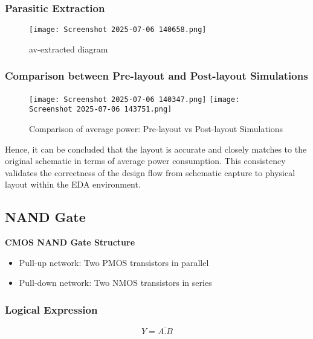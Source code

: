 \documentclass[12pt]{article}
\begin{document}
    \subsubsection{Parasitic Extraction}
        \begin{figure}[H]
            \centering
            \texttt{[image: Screenshot 2025-07-06 140658.png]}
            \caption{av-extracted diagram}
            \label{fig:enter-label}
        \end{figure}

 \subsubsection{Comparison between Pre-layout and Post-layout Simulations}
\begin{figure}[H]
    \centering
    \texttt{[image: Screenshot 2025-07-06 140347.png]}
    \vspace{0.5cm} %
    \texttt{[image: Screenshot 2025-07-06 143751.png]}
    \caption{Comparison of average power: Pre-layout vs Post-layout Simulations}
    \label{fig:power-comparison}
\end{figure}
 Hence, it can be concluded that the layout is accurate and closely matches to the original schematic in terms of average power consumption. This consistency validates the correctness of the design flow from schematic capture to physical layout within the EDA environment.




\newpage
\subsection{\large{\textbf{NAND Gate}}}
     \textbf{CMOS NAND Gate Structure}
     \begin{itemize}
         \item Pull-up network: Two PMOS transistors in parallel
        
        \item Pull-down network: Two NMOS transistors in series
     \end{itemize}
     \subsubsection{Logical Expression}
     \[
        Y = \overline{A . B}
        \]
\end{document}
